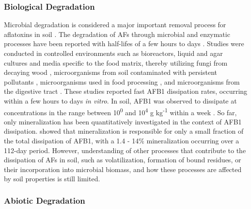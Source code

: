 \subsubsection*{Biological Degradation} 

Microbial degradation is considered a major important removal process for aflatoxins in soil \citep{fouche2020aflatoxins}. The degradation of AFs through microbial and enzymatic processes have been reported with half-lifes of a few hours to days \citep{wu2009biological, verheecke2016microbial}. Studies were conducted in controlled environments such as bioreactors, liquid and agar cultures and media specific to the food matrix, thereby utilizing fungi from decaying wood \citep{alberts2009degradation, motomura2003purification}, microorganisms from soil contaminated with persistent pollutants \citep{teniola2005degradation, alberts2006biological}, microorganisms used in food processing \citep{megalla1982detoxification}, and microorganisms from the digestive tract \citep{kiessling1984metabolism, jones1996degradation}. These studies reported fast AFB1 dissipation rates, occurring within a few hours to days \textit{in vitro}. In soil, AFB1 was observed to dissipate at concentrations in the range between 10\textsuperscript{0} and 10\textsuperscript{4} \textmu g kg\textsuperscript{-1} within a week \citep{accinelli2008aspergillus, angle1980decomposition, angle1986aflatoxin}. So far, only mineralization has been quantitatively investigated in the context of AFB1 dissipation. \citet{angle1986aflatoxin} showed that mineralization is responsible for only a small fraction of the total dissipation of AFB1, with a 1.4 - 14\% mineralization occurring over a 112-day period. However, understanding of other processes that contribute to the dissipation of AFs in soil, such as volatilization, formation of bound residues, or their incorporation into microbial biomass, and how these processes are affected by soil properties is still limited.

\subsubsection*{Abiotic Degradation} 

